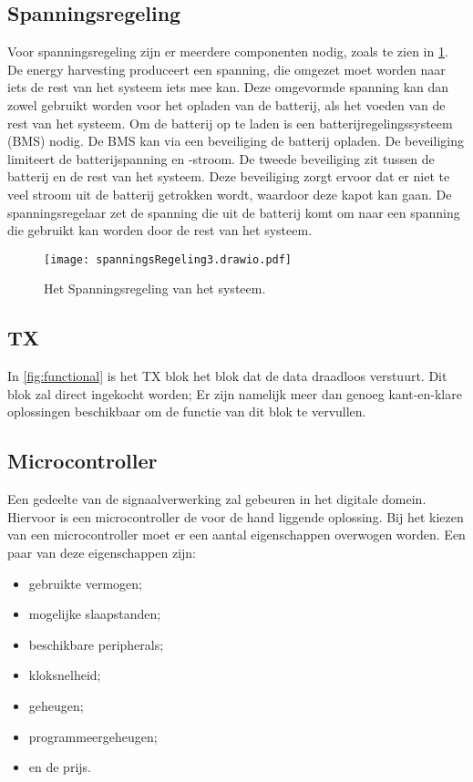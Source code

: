 \subsection{Spanningsregeling}
Voor spanningsregeling zijn er meerdere componenten nodig, zoals te zien in \cref{fig:spanningsregeling}. De energy harvesting produceert een spanning, die omgezet moet worden naar iets de rest van het systeem iets mee kan. Deze omgevormde spanning kan dan zowel gebruikt worden voor het opladen van de batterij, als het voeden van de rest van het systeem.
Om de batterij op te laden is een batterijregelingssysteem (BMS) nodig. De BMS kan via een beveiliging de batterij opladen. De beveiliging limiteert de batterijspanning en -stroom. De tweede beveiliging zit tussen de batterij en de rest van het systeem. Deze beveiliging zorgt ervoor dat er niet te veel stroom uit de batterij getrokken wordt, waardoor deze kapot kan gaan. De spanningsregelaar zet de spanning die uit de batterij komt om naar een spanning die gebruikt kan worden door de rest van het systeem. 

\begin{figure}[ht]
    \centering
    \texttt{[image: spanningsRegeling3.drawio.pdf]}
    \caption{Het Spanningsregeling van het systeem.}
    \label{fig:spanningsregeling}
\end{figure}

\subsection{TX}
In \cref{fig:functional} is het TX blok het blok dat de data draadloos verstuurt. Dit blok zal direct ingekocht worden; Er zijn namelijk meer dan genoeg kant-en-klare oplossingen beschikbaar om de functie van dit blok te vervullen.


\subsection{Microcontroller}
Een gedeelte van de signaalverwerking zal gebeuren in het digitale domein. Hiervoor is een microcontroller de voor de hand liggende oplossing. Bij het kiezen van een microcontroller moet er een aantal eigenschappen overwogen worden. Een paar van deze eigenschappen zijn:
\begin{itemize}
    \item gebruikte vermogen;
    \item mogelijke slaapstanden;
    \item beschikbare peripherals;
    \item kloksnelheid;
    \item geheugen;
    \item programmeergeheugen;
    \item en de prijs.
\end{itemize}
